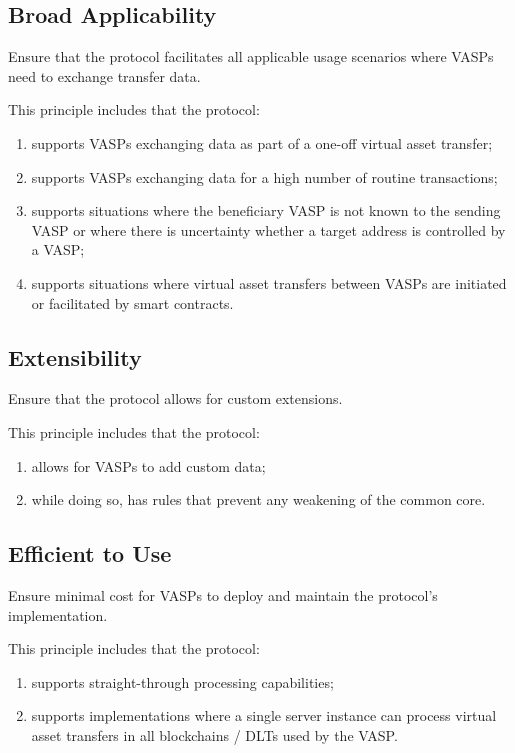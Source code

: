 \documentclass{article}
\begin{document}
\subsection{Broad Applicability}
    \begin{mdframed}[backgroundcolor=gray!20] 
    Ensure that the protocol facilitates all applicable usage scenarios where VASPs need to exchange transfer data.
    \end{mdframed}
This principle includes that the protocol:
\renewcommand{\theenumi}{\alph{enumi}}
 \begin{enumerate}
   \item supports VASPs exchanging data as part of a one-off virtual asset transfer;
   \item supports VASPs exchanging data for a high number of routine transactions;
   \item supports situations where the beneficiary VASP is not known to the sending VASP or where there is uncertainty whether a target address is controlled by a VASP;
   \item supports situations where virtual asset transfers between VASPs are initiated or facilitated by smart contracts.
  \end{enumerate}
  
\subsection{Extensibility}
    \begin{mdframed}[backgroundcolor=gray!20] 
    Ensure that the protocol allows for custom extensions.
    \end{mdframed}
This principle includes that the protocol:
\renewcommand{\theenumi}{\alph{enumi}}
 \begin{enumerate}
   \item allows for VASPs to add custom data;
   \item while doing so, has rules that prevent any weakening of the common core.
  \end{enumerate}
  \newpage
  
\subsection{Efficient to Use}
    \begin{mdframed}[backgroundcolor=gray!20] 
    Ensure minimal cost for VASPs to deploy and maintain the protocol's implementation.
    \end{mdframed}
This principle includes that the protocol:
\renewcommand{\theenumi}{\alph{enumi}}
 \begin{enumerate}
   \item supports straight-through processing capabilities;
   \item supports implementations where a single server instance can process virtual asset transfers in all blockchains / DLTs used by the VASP.
  \end{enumerate}
\end{document}
